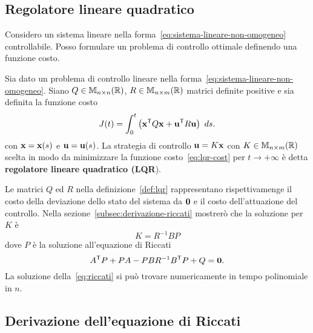 \subsection{Regolatore lineare quadratico}
Considero un sistema lineare nella forma~\eqref{eq:sistema-lineare-non-omogeneo} controllabile.
Posso formulare un problema di controllo ottimale definendo una funzione costo.
\begin{definition}
    Sia dato un problema di controllo lineare nella forma~\eqref{eq:sistema-lineare-non-omogeneo}.
    Siano $Q \in \mathbb{M}_{n\times n}(\mathbb{R})$, $R \in \mathbb{M}_{n\times m}(\mathbb{R})$ matrici definite positive
    e sia definita la funzione costo
    \begin{equation}
        J(t) = \int_0^t
            \left( \mathbf{x}^{\mathsf{T}} Q \mathbf{x} + \mathbf{u}^{\mathsf{T}} R \mathbf{u} \right)
        \ ds.
        \label{eq:lqr-cost}
    \end{equation}
    con $\mathbf{x} = \mathbf{x}(s)$ e $\mathbf{u} = \mathbf{u}(s)$.
    La strategia di controllo $\mathbf{u} = K\mathbf{x}$ con $K \in \mathbb{M}_{n\times m}(\mathbb{R})$ scelta in modo da
    minimizzare la funzione costo~\ref{eq:lqr-cost} per $t \to +\infty$ è
    detta \textbf{regolatore lineare quadratico (\textsc{LQR}}).
    \label{def:lqr}
\end{definition}
Le matrici $Q$ ed $R$ nella definizione~\ref{def:lqr} rappresentano rispettivamenge
il costo della deviazione dello stato del sistema da $\mathbf{0}$ e il costo dell'attuazione del
controllo.
Nella sezione~\ref{subsec:derivazione-riccati} mostrerò che la soluzione per $K$ è
\begin{equation}
    K = R^{-1}BP
    \label{eq:riccati-K}
\end{equation}
dove $P$ è la soluzione all'equazione di Riccati
\begin{equation}
        A^{\mathsf{T}} P + P A - P B R^{-1} B^{\mathsf{T}} P + Q = \mathbf{0}.
    \label{eq:riccati}
\end{equation}
La soluzione della~\eqref{eq:riccati} si può trovare numericamente in tempo polinomiale
in $n$.

\subsection{Derivazione dell'equazione di Riccati}

